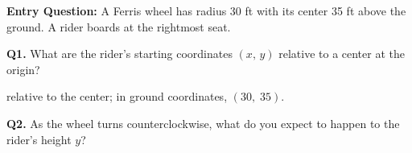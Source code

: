 \documentclass[10pt]{article}
\begin{document}
\vspace{0.08in}

\begin{hookbox}
\textbf{Entry Question:} A Ferris wheel has radius 30 ft with its center
35 ft above the ground. A rider boards at the rightmost seat.

\vspace{4pt}
\textbf{Q1.} What are the rider's starting coordinates $(x,\,y)$ relative
to a center at the origin?

\vspace{4pt}
 relative to the center; in ground coordinates, $(30,\;35)$.

\textbf{Q2.} As the wheel turns counterclockwise, what do you expect
to happen to the rider's height $y$?

\vspace{4pt}
\end{hookbox}

\vspace{0.08in}
\end{document}
